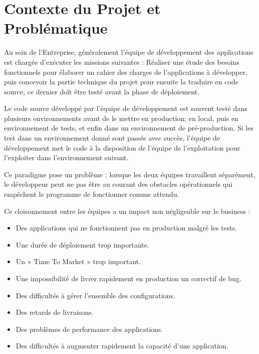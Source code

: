 \documentclass[a4paper,11pt,oneside]{report}
\begin{document}
\newpage

\chapter{Contexte du Projet et Problématique}

\newpage

Au sein de l’Entreprise, généralement l'équipe de développement des applications est chargée d’exécuter les missions suivantes : Réaliser une étude des besoins fonctionnels pour élaborer un cahier des charges de l’applications à développer, puis concevoir la partie technique du projet pour ensuite la traduire en code source, ce dernier doît être testé avant la phase de déploiement.
\newline

Le code source développé par l’équipe de développement est souvent testé dans plusieurs environnements avant de le mettre en production; en local, puis en environnement de tests, et enfin dans un environnement de pré-production. Si les test dans un environnement donné sont passés avec succès, l'équipe de développement met le code à la disposition de l’équipe de l’exploitation pour l’exploiter dans l’environnement suivant.
\newline

Ce paradigme pose un problème : lorsque les deux équipes travaillent séparément, le développeur peut ne pas être au courant des obstacles opérationnels qui empêchent le programme de fonctionner comme attendu.
\newline

Ce cloisonnement entre les équipes a un impact non négligeable sur le business :
\begin{itemize}
\item Des applications qui ne fonctionnent pas en production malgré les tests.
\item Une durée de déploiement trop importante.
\item Un « Time To Market » trop important.
\item Une impossibilité de livrer rapidement en production un correctif de bug.
\item Des difficultés à gérer l’ensemble des configurations.
\item Des retards de livraisons.
\item Des problèmes de performance des applications.
\item Des difficultés à augmenter rapidement la capacité d’une application.
\newline
\end{itemize}
\end{document}
